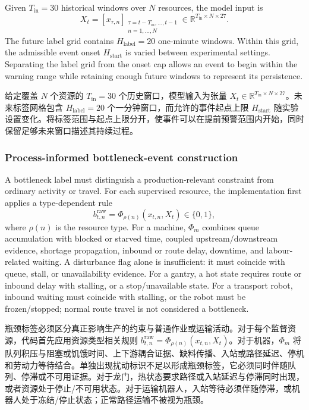 \documentclass[a4paper,fleqn]{cas-dc}
\newcommand{\zhpara}[1]{%
  \par\begingroup\small\color{black!72}\noindent #1\par\endgroup}
\begin{document}
Given $T_{\mathrm{in}}=30$ historical windows over $N$ resources, the model input is
\begin{equation}
X_t=\left[x_{\tau,n}\right]_
{\substack{\tau=t-T_{\mathrm{in}},\ldots,t-1\\n=1,\ldots,N}}
\in\mathbb{R}^{T_{\mathrm{in}}\times N\times 27}.
\end{equation}
The future label grid contains $H_{\mathrm{label}}=20$ one-minute windows. Within this grid, the admissible event onset $H_{\mathrm{start}}$ is varied between experimental settings. Separating the label grid from the onset cap allows an event to begin within the warning range while retaining enough future windows to represent its persistence.

\zhpara{给定覆盖 $N$ 个资源的 $T_{\mathrm{in}}=30$ 个历史窗口，模型输入为张量 $X_t\in\mathbb{R}^{T_{\mathrm{in}}\times N\times27}$。未来标签网格包含 $H_{\mathrm{label}}=20$ 个一分钟窗口，而允许的事件起点上限 $H_{\mathrm{start}}$ 随实验设置变化。将标签范围与起点上限分开，使事件可以在提前预警范围内开始，同时保留足够未来窗口描述其持续过程。}

\subsubsection{Process-informed bottleneck-event construction}

A bottleneck label must distinguish a production-relevant constraint from ordinary activity or travel. For each supervised resource, the implementation first applies a type-dependent rule
\begin{equation}
b^{\mathrm{raw}}_{t,n}=\Phi_{\rho(n)}(x_{t,n},X_t)\in\{0,1\},
\end{equation}
where $\rho(n)$ is the resource type. For a machine, $\Phi_m$ combines queue accumulation with blocked or starved time, coupled upstream/downstream evidence, shortage propagation, inbound or route delay, downtime, and labour-related waiting. A disturbance flag alone is insufficient: it must coincide with queue, stall, or unavailability evidence. For a gantry, a hot state requires route or inbound delay with stalling, or a stop/unavailable state. For a transport robot, inbound waiting must coincide with stalling, or the robot must be frozen/stopped; normal route travel is not considered a bottleneck.

\zhpara{瓶颈标签必须区分真正影响生产的约束与普通作业或运输活动。对于每个监督资源，代码首先应用资源类型相关规则 $b^{\mathrm{raw}}_{t,n}=\Phi_{\rho(n)}(x_{t,n},X_t)$。对于机器，$\Phi_m$ 将队列积压与阻塞或饥饿时间、上下游耦合证据、缺料传播、入站或路径延迟、停机和劳动力等待结合。单独出现扰动标识不足以形成瓶颈标签，它必须同时伴随队列、停滞或不可用证据。对于龙门，热状态要求路径或入站延迟与停滞同时出现，或者资源处于停止/不可用状态。对于运输机器人，入站等待必须伴随停滞，或机器人处于冻结/停止状态；正常路径运输不被视为瓶颈。}
\end{document}
